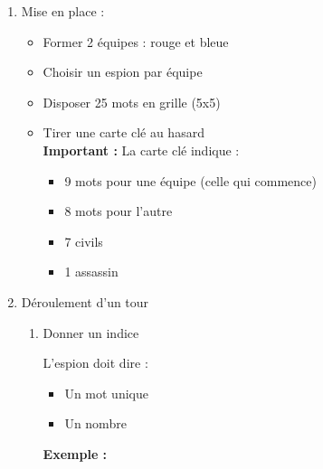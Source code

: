 \documentclass[12pt,a4paper]{article}
\begin{document}
            \begin{enumerate}

                \item Mise en place :

                    \begin{itemize}
                        \item Former 2 équipes : rouge et bleue
                        \item Choisir un espion par équipe
                        \item Disposer 25 mots en grille (5x5)
                        \item Tirer une carte clé au hasard\\ \textbf{Important :} La carte clé indique :
                        \begin{itemize}
                            \item 9 mots pour une équipe (celle qui commence)
                            \item 8 mots pour l’autre
                            \item 7 civils
                            \item 1 assassin
                        \end{itemize}
                    \end{itemize}

                \vspace{0.5cm}
                \item Déroulement d’un tour

                    \begin{enumerate}
                        \item Donner un indice

                            L'espion doit dire :

                            \begin{itemize}
                                \item Un mot unique
                                \item Un nombre
                            \end{itemize}

                            \vspace{0.5cm}


                            \textbf{Exemple :}


\end{enumerate}
\end{enumerate}
\end{document}
